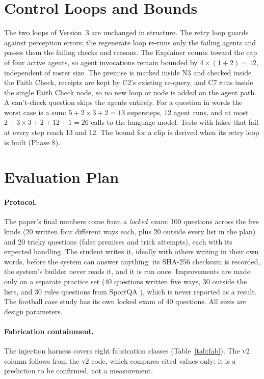 \documentclass[11pt,a4paper]{article}
\begin{document}
\section{Control Loops and Bounds}

The two loops of Version~3 are unchanged in structure. The retry loop guards
against perception errors; the regenerate loop re-runs only the failing agents
and passes them the failing checks and reasons. The Explainer counts toward the
cap of four active agents, so agent invocations remain bounded by
$4 \times (1 + 2) = 12$, independent of roster size. The premise is marked inside
N3 and checked inside the Faith Check, receipts are kept by C2's existing
re-query, and C7 runs inside the single Faith Check node, so no new loop or node
is added on the agent path. A can't-check question skips the agents entirely.
For a question in words the worst case is a sum: $5 + 2 \times 3 + 2 = 13$
supersteps, 12 agent runs, and at most $2 + 3 \times 3 + 2 + 12 + 1 = 26$ calls to
the language model. Tests with fakes that fail at every step reach 13 and 12. The
bound for a clip is derived when its retry loop is built (Phase 8).

\section{Evaluation Plan}
\label{sec:eval}

\paragraph{Protocol.} The paper's final numbers come from a \emph{locked exam}:
100 questions across the five kinds (20 written four different ways each, plus
20 outside every list in the plan) and 20 tricky questions (false premises and
trick attempts), each with its expected handling. The student writes it, ideally
with others writing in their own words, before the system can answer anything;
its SHA-256 checksum is recorded, the system's builder never reads it, and it is
run once. Improvements are made only on a separate practice set (40 questions
written five ways, 30 outside the lists, and 30 rules questions from SportQA
\cite{sportqa}), which is never reported as a result. The football case study
has its own locked exam of 40 questions. All sizes are design parameters.

\paragraph{Fabrication containment.} The injection harness covers eight
fabrication classes (Table~\ref{tab:fab}). The v2 column follows from the v2
code, which compares cited values only; it is a prediction to be confirmed, not
a measurement.
\end{document}
